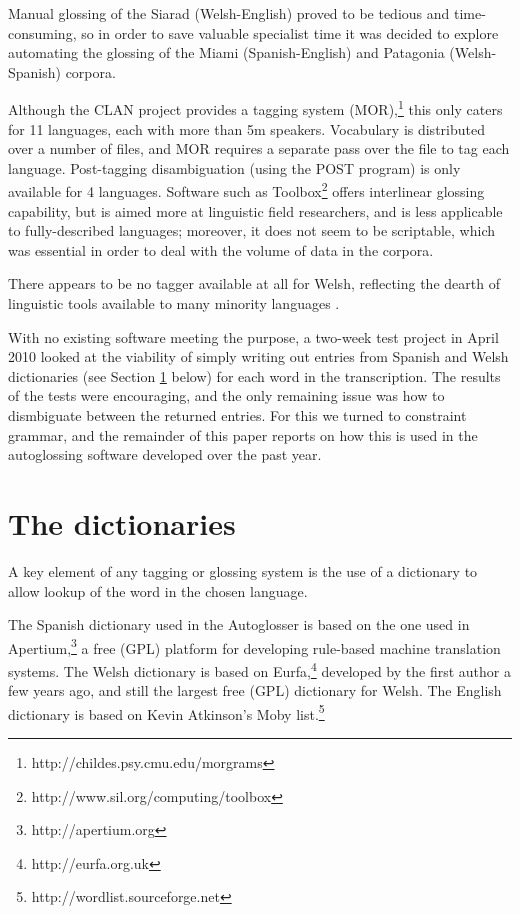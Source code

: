 \documentclass[11pt]{article}
\begin{document}
Manual glossing of the Siarad (Welsh-English) proved to be tedious and time-consuming, so in order to save valuable specialist time it was decided to explore automating the glossing of the Miami (Spanish-English) and Patagonia (Welsh-Spanish) corpora.

Although the CLAN project provides a tagging system (MOR),\footnote{http://childes.psy.cmu.edu/morgrams} this only caters for 11 languages, each with more than 5m speakers.  Vocabulary is distributed over a number of files, and MOR requires a separate pass over the file to tag each language.  Post-tagging disambiguation (using the POST program) is only available for 4 languages.  Software such as Toolbox\footnote{http://www.sil.org/computing/toolbox} offers interlinear glossing capability, but is aimed more at linguistic field researchers, and is less applicable to fully-described languages; moreover, it does not seem to be scriptable, which was essential in order to deal with the volume of data in the corpora.

There appears to be no tagger available at all for Welsh, reflecting the dearth of linguistic tools available to many minority languages \cite{antonsen2010}.

With no existing software meeting the purpose, a two-week test project in April 2010 looked at the viability of simply writing out entries from Spanish and Welsh dictionaries (see Section \ref{sec:dictionaries} below) for each word in the transcription.  The results of the tests were encouraging, and the only remaining issue was how to dismbiguate between the returned entries.  For this we turned to constraint grammar, and the remainder of this paper reports on how this is used in the autoglossing software developed over the past year.


\section{The dictionaries}
\label{sec:dictionaries}


A key element of any tagging or glossing system is the use of a dictionary to allow lookup of the word in the chosen language.
  
The Spanish dictionary used in the Autoglosser is based on the one used in Apertium,\footnote{http://apertium.org} a free (GPL) platform for developing rule-based machine translation systems.  The Welsh dictionary is based on Eurfa,\footnote{http://eurfa.org.uk} developed by the first author a few years ago, and still the largest free (GPL) dictionary for Welsh.  The English dictionary is based on Kevin Atkinson's Moby list.\footnote{http://wordlist.sourceforge.net}
\end{document}
